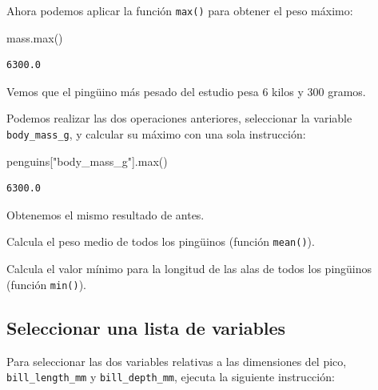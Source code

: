 \documentclass[
  a4paper,
  noprof,
  12pt,
  notoc,
  nosols,
  nobib]{mnye}
\newenvironment{Shaded}{\begin{snugshade}}{\end{snugshade}}
\newcommand{\BuiltInTok}[1]{\textcolor[rgb]{0.00,0.23,0.31}{#1}}
\newcommand{\NormalTok}[1]{\textcolor[rgb]{0.00,0.23,0.31}{#1}}
\newcommand{\StringTok}[1]{\textcolor[rgb]{0.13,0.47,0.30}{#1}}
\renewenvironment{exercise}[1][]{
            \if\relax\detokenize{#1}\relax
                \ex
            \else
                \ex[note={#1}]
            \fi
        }{\endex}
\theoremstyle{definition}
\newtheorem{exercise}{Ejercicio}[section]
\theoremstyle{remark}
\begin{document}
Ahora podemos aplicar la función \texttt{max()} para obtener el peso
máximo:

\begin{Shaded}
\begin{Highlighting}[]
\NormalTok{mass.}\BuiltInTok{max}\NormalTok{()}
\end{Highlighting}
\end{Shaded}

\begin{verbatim}
6300.0
\end{verbatim}

Vemos que el pingüino más pesado del estudio pesa \(6\) kilos y \(300\)
gramos.

Podemos realizar las dos operaciones anteriores, seleccionar la variable
\texttt{body\_mass\_g}, y calcular su máximo con una sola instrucción:

\begin{Shaded}
\begin{Highlighting}[]
\NormalTok{penguins[}\StringTok{"body\_mass\_g"}\NormalTok{].}\BuiltInTok{max}\NormalTok{()}
\end{Highlighting}
\end{Shaded}

\begin{verbatim}
6300.0
\end{verbatim}

Obtenemos el mismo resultado de antes.

\begin{exercise}[]%
\protect\hypertarget{exr-subset-variable-1}{}\label{exr-subset-variable-1}%
Calcula el peso medio de todos los pingüinos (función \texttt{mean()}).

\end{exercise}

\begin{exercise}[]%
\protect\hypertarget{exr-subset-variable-2}{}\label{exr-subset-variable-2}%
Calcula el valor mínimo para la longitud de las alas de todos los
pingüinos (función \texttt{min()}).

\end{exercise}

\hypertarget{sec-subset-several-variables}{%
\subsection{Seleccionar una lista de
variables}\label{sec-subset-several-variables}}

Para seleccionar las dos variables relativas a las dimensiones del pico,
\texttt{bill\_length\_mm} y \texttt{bill\_depth\_mm}, ejecuta la
siguiente instrucción:
\end{document}
